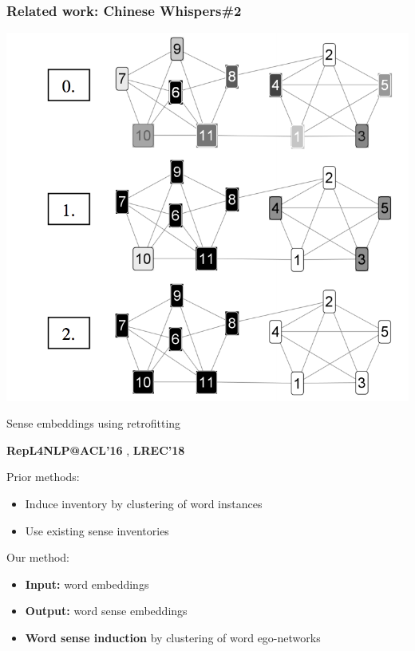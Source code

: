 \begin{frame}[fragile]
\frametitle{Related work: Chinese Whispers\#2}
\begin{center}
 \includegraphics[height=0.59\textwidth]{cw2}
 
 \end{center}
\end{frame}



\begin{frame}{Sense embeddings using retrofitting}
	
	 {\footnotesize \textbf{RepL4NLP@ACL'16} \cite{pelevina-EtAl:2016:RepL4NLP}, \textbf{LREC'18} \cite{remus:2018}}
	
	\begin{block}{Prior methods:}
		\vspace{0.25cm}

	\begin{itemize}	
	\item Induce inventory by \alert{clustering of word instances} %
	\item Use \alert{existing} sense inventories %
	\end{itemize}
\end{block}


	\begin{block}{Our method:}
		\vspace{0.25cm}

	\begin{itemize}	
	\item \textbf{Input:} word embeddings
	\item \textbf{Output:} word sense embeddings
	\item \textbf{Word sense induction} by \alert{clustering of word ego-networks}

	\end{itemize}
\end{block}


\end{frame}

